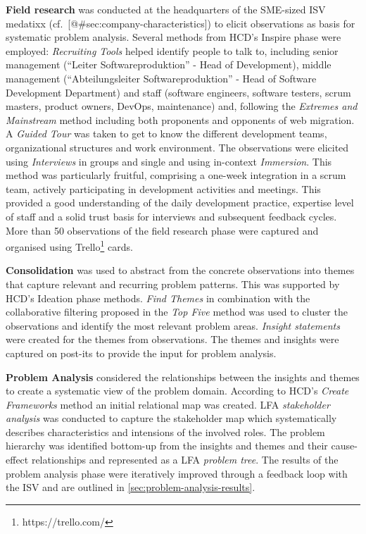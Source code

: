 \textbf{Field research} was conducted at the headquarters of the SME-sized ISV medatixx (cf.~{[}@\#sec:company-characteristics{]}) to elicit observations as basis for systematic problem analysis.
Several methods from HCD's Inspire phase were employed: \emph{Recruiting Tools} helped identify people to talk to, including senior management (``Leiter Softwareproduktion'' - Head of Development), middle management (``Abteilungsleiter Softwareproduktion'' - Head of Software Development Department) and staff (software engineers, software testers, scrum masters, product owners, DevOps, maintenance) and, following the \emph{Extremes and Mainstream} method including both proponents and opponents of web migration.
A \emph{Guided Tour} was taken to get to know the different development teams, organizational structures and work environment.
The observations were elicited using \emph{Interviews} in groups and single and using in-context \emph{Immersion}.
This method was particularly fruitful, comprising a one-week integration in a scrum team, actively participating in development activities and meetings.
This provided a good understanding of the daily development practice, expertise level of staff and a solid trust basis for interviews and subsequent feedback cycles.
More than 50 observations of the field research phase were captured and organised using Trello\footnote{https://trello.com/} cards.

\textbf{Consolidation} was used to abstract from the concrete observations into themes that capture relevant and recurring problem patterns.
This was supported by HCD's Ideation phase methods.
\emph{Find Themes} in combination with the collaborative filtering proposed in the \emph{Top Five} method was used to cluster the observations and identify the most relevant problem areas.
\emph{Insight statements} were created for the themes from observations.
The themes and insights were captured on post-its to provide the input for problem analysis.

\textbf{Problem Analysis} considered the relationships between the insights and themes to create a systematic view of the problem domain.
According to HCD's \emph{Create Frameworks} method an initial relational map was created.
LFA \emph{stakeholder analysis} was conducted to capture the stakeholder map which systematically describes characteristics and intensions of the involved roles.
The problem hierarchy was identified bottom-up from the insights and themes and their cause-effect relationships and represented as a LFA \emph{problem tree}.
The results of the problem analysis phase were iteratively improved through a feedback loop with the ISV and are outlined in \cref{sec:problem-analysis-results}.

